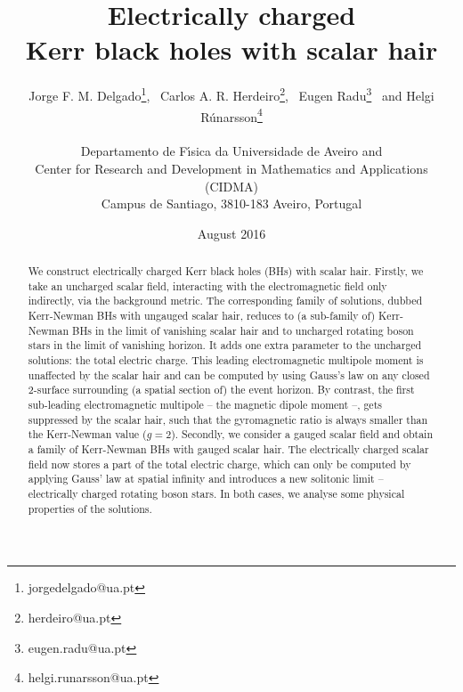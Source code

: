 \documentclass{article}
\begin{document}
\title{{\bf \Large Electrically charged \\ Kerr black holes with scalar hair}}

\vspace{0.5cm}

 \author{
 {\large Jorge F. M. Delgado}\footnote{jorgedelgado@ua.pt}, \
{\large Carlos A. R. Herdeiro}\footnote{herdeiro@ua.pt}, \
{\large Eugen Radu}\footnote{eugen.radu@ua.pt}  \ and
{\large Helgi R\'unarsson}\footnote{helgi.runarsson@ua.pt}
\\ 
\\
{\small Departamento de F\'\i sica da Universidade de Aveiro and} \\ 
{\small Center for Research and Development in Mathematics and Applications (CIDMA)} \\ 
{\small   Campus de Santiago, 3810-183 Aveiro, Portugal}
}


 
 

\date{August 2016}
\maketitle

\begin{abstract}
We construct electrically charged Kerr black holes (BHs) with scalar hair. 
Firstly, we take an uncharged scalar field, 
interacting with the electromagnetic field only indirectly,  via the background metric. 
The corresponding family of solutions, 
dubbed Kerr-Newman BHs with ungauged scalar hair, 
reduces to (a sub-family of) Kerr-Newman BHs in the limit of vanishing scalar hair 
and to uncharged rotating boson stars in the limit of vanishing horizon. 
It adds one extra parameter to the uncharged solutions: the total electric charge. 
This leading electromagnetic multipole moment is unaffected by the scalar hair 
and can be computed by using Gauss's law on any closed 2-surface surrounding  
(a spatial section of) the event horizon. 
By contrast, the first sub-leading electromagnetic multipole -- the magnetic dipole moment --, 
gets suppressed by the scalar hair, such that the gyromagnetic ratio is always smaller than the Kerr-Newman value ($g=2$).  
Secondly, we consider a gauged scalar field and obtain a family of Kerr-Newman BHs with gauged scalar hair. 
The  electrically charged scalar field now stores a part of the total electric charge, 
which can only be computed by applying Gauss' law at spatial infinity 
and introduces a new solitonic limit -- electrically charged rotating boson stars. 
In both cases, we analyse some physical properties of the solutions.
\end{abstract}
\end{document}
